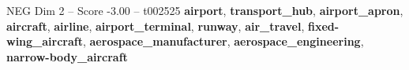 \begin{textsample}{NEG Dim 2 – Score -3.00 – t002525}  \label{ex:f2_neg_028}
\textbf{airport}, \textbf{transport\_hub}, \textbf{airport\_apron}, \textbf{aircraft}, \textbf{airline}, \textbf{airport\_terminal}, \textbf{runway}, \textbf{air\_travel}, \textbf{fixed-wing\_aircraft}, \textbf{aerospace\_manufacturer}, \textbf{aerospace\_engineering}, \textbf{narrow-body\_aircraft}

\end{textsample}
